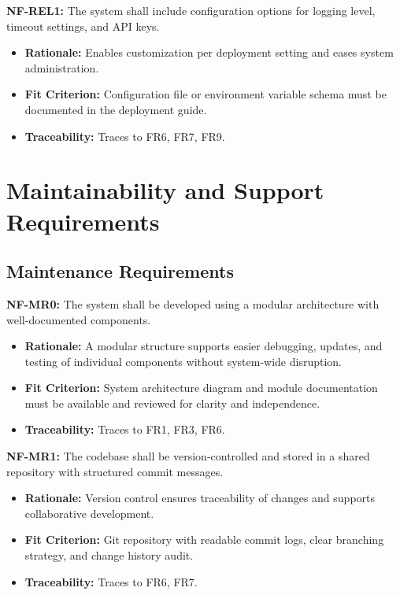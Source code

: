 \documentclass[12pt]{article}
\begin{document}
\textbf{NF-REL1:} The system shall include configuration options for logging level, timeout settings, and API keys.
\begin{itemize}
    \item \textbf{Rationale:} Enables customization per deployment setting and eases system administration.
    \item \textbf{Fit Criterion:} Configuration file or environment variable schema must be documented in the deployment guide.
    \item \textbf{Traceability:} Traces to FR6, FR7, FR9.
\end{itemize}
\section{Maintainability and Support Requirements}


\subsection{Maintenance Requirements}

\textbf{NF-MR0:} The system shall be developed using a modular architecture with well-documented components.
\begin{itemize}
    \item \textbf{Rationale:} A modular structure supports easier debugging, updates, and testing of individual components without system-wide disruption.
    \item \textbf{Fit Criterion:} System architecture diagram and module documentation must be available and reviewed for clarity and independence.
    \item \textbf{Traceability:} Traces to FR1, FR3, FR6.
\end{itemize}

\textbf{NF-MR1:} The codebase shall be version-controlled and stored in a shared repository with structured commit messages.
\begin{itemize}
    \item \textbf{Rationale:} Version control ensures traceability of changes and supports collaborative development.
    \item \textbf{Fit Criterion:} Git repository with readable commit logs, clear branching strategy, and change history audit.
    \item \textbf{Traceability:} Traces to FR6, FR7.
\end{itemize}
\end{document}
